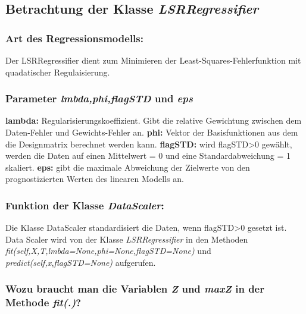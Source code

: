 \subsection{
    Betrachtung der Klasse \textit{LSRRegressifier}
}

\subsubsection{ Art des Regressionsmodells: }

\noindent
 \vspace{0px}
Der LSRRegressifier dient zum Minimieren der Least-Squares-Fehlerfunktion mit quadatischer Regulaisierung.

\subsubsection{ Parameter \textit{lmbda,phi,flagSTD} und \textit{eps} }

\noindent
\vspace{0px}
\textbf{lambda:} Regularisierungskoeffizient. Gibt die relative Gewichtung zwischen dem Daten-Fehler und Gewichts-Fehler an. 
\newline
\noindent
\vspace{0px}
\textbf{phi:} Vektor der Basisfunktionen aus dem die Designmatrix berechnet werden kann. 
\newline
\noindent
\vspace{0px}
\textbf{flagSTD:} wird flagSTD>0 gewählt, werden die Daten auf einen Mittelwert = 0 und eine Standardabweichung = 1 skaliert.  
\newline
\noindent
\vspace{0px}
\textbf{eps:} gibt die maximale Abweichung der Zielwerte von den prognostizierten Werten des linearen Modells an. 

\subsubsection{ Funktion der Klasse \textit{DataScaler}: }

\noindent
\vspace{0px}
Die Klasse DataScaler standardisiert die Daten, wenn flagSTD>0 gesetzt ist. 
Data Scaler wird von der Klasse \textit{LSRRegressifier} in den Methoden \textit{fit(self,X,T,lmbda=None,phi=None,flagSTD=None)} und \textit{predict(self,x,flagSTD=None)} aufgerufen.


\subsubsection{ Wozu braucht man die Variablen \textit{Z} und \textit{maxZ} in der Methode \textit{fit(.)}? }

